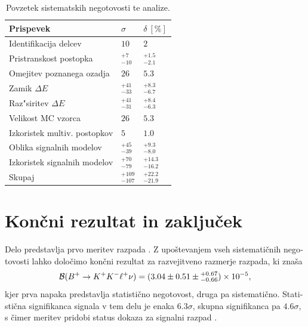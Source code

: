 \begin{otherlanguage}{slovene}
\begin{table}[H]
	\centering
	\begin{tabular}{l|l|l}
		Prispevek & $\sigma$ & $\delta~[\%]$ \\
		\toprule
		Identifikacija delcev & $10$ & $2$ \\
		Pristranskost postopka & $ {}^{+7}_{-10}$ & ${}^{+1.5}_{-2.1}$ \\
		Omejitev poznanega ozadja & $26$ & $5.3$ \\
		Zamik $\Delta E$ & ${}^{+41}_{-33}$ & ${}^{+8.3}_{-6.7}$ \\
		Raz"siritev $\Delta E$ & ${}^{+41}_{-31}$ & ${}^{+8.4}_{-6.3}$ \\
		Velikost MC vzorca & $26$ & $5.3$ \\
		Izkoristek multiv. postopkov & $5$ & $1.0$\\
		Oblika signalnih modelov & ${}^{+45}_{-39}$ & ${}^{+9.3}_{-8.0}$ \\
		Izkoristek signalnih modelov & ${}^{+70}_{-79}$ & ${}^{+14.3}_{-16.2}$ \\
		\midrule
		Skupaj & ${} ^{+109}_{-107}$ & ${}^{+22.2}_{-21.9}$ \\
		\bottomrule
	\end{tabular}
	\captionsetup{width=0.8\linewidth}
	\caption{Povzetek sistematskih negotovosti te analize.}
	\label{tab:sys_summary_si}
\end{table}

\section{Končni rezultat in zaključek}
Delo predstavlja prvo meritev razpada \decayb. Z upoštevanjem vseh sistematičnih negotovosti lahko določimo končni rezultat za razvejitveno razmerje razpada, ki znaša
\begin{equation}
\mathcal{B}(B^+ \to K^+ K^- \ell^+ \nu) = (3.04 \pm 0.51 \pm {}^{+0.67}_{-0.66})\times 10^{-5},
\end{equation}
kjer prva napaka predstavlja statistično negotovost, druga pa sistematično. Statistična signifikanca signala v tem delu je enaka $6.3\sigma$, skupna signifikanca pa $4.6\sigma$, s čimer meritev pridobi status dokaza za signalni razpad \decayb. 

\end{otherlanguage}
